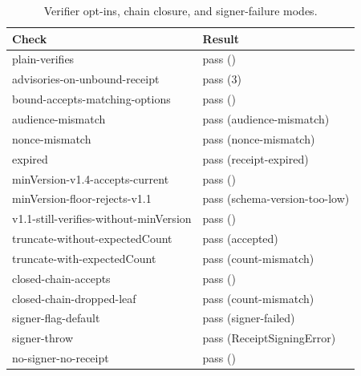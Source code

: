 \begin{table}[t]\centering\caption{Verifier opt-ins, chain closure, and signer-failure modes.}\label{tab:v16}\scriptsize\begin{tabular}{@{}ll@{}}\toprule Check & Result\\\midrule
plain-verifies & pass ()\\
advisories-on-unbound-receipt & pass (3)\\
bound-accepts-matching-options & pass ()\\
audience-mismatch & pass (audience-mismatch)\\
nonce-mismatch & pass (nonce-mismatch)\\
expired & pass (receipt-expired)\\
minVersion-v1.4-accepts-current & pass ()\\
minVersion-floor-rejects-v1.1 & pass (schema-version-too-low)\\
v1.1-still-verifies-without-minVersion & pass ()\\
truncate-without-expectedCount & pass (accepted)\\
truncate-with-expectedCount & pass (count-mismatch)\\
closed-chain-accepts & pass ()\\
closed-chain-dropped-leaf & pass (count-mismatch)\\
signer-flag-default & pass (signer-failed)\\
signer-throw & pass (ReceiptSigningError)\\
no-signer-no-receipt & pass ()\\
\bottomrule\end{tabular}\end{table}
